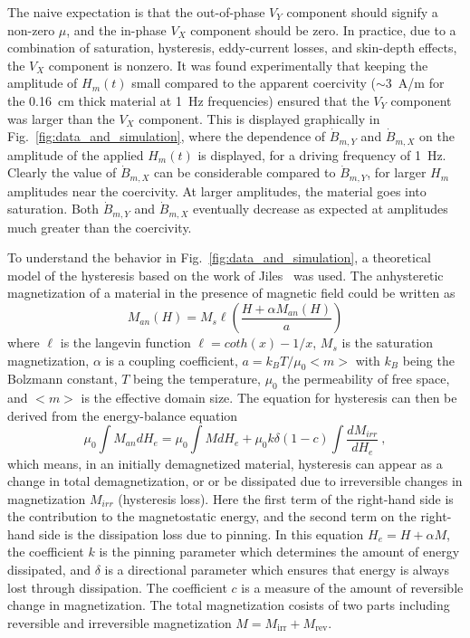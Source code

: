 The naive expectation is that the out-of-phase $V_Y$ component should
signify a non-zero $\mu$, and the in-phase $V_X$ component should be
zero.  In practice, due to a combination of saturation, hysteresis,
eddy-current losses, and skin-depth effects, the $V_X$ component is
nonzero.  It was found experimentally that keeping the amplitude of
$H_m(t)$ small compared to the apparent coercivity ($\sim 3$~A/m for
the 0.16~cm thick material at 1~Hz frequencies) ensured that the $V_Y$
component was larger than the $V_X$ component.  This is displayed
graphically in Fig.~\ref{fig:data_and_simulation}, where the
dependence of $\dot{B}_{m,Y}$ and $\dot{B}_{m,X}$ on the amplitude of
the applied $H_m(t)$ is displayed, for a driving frequency of 1~Hz.
Clearly the value of $\dot{B}_{m,X}$ can be considerable compared to
$\dot{B}_{m,Y}$, for larger $H_m$ amplitudes near the coercivity.  At
larger amplitudes, the material goes into saturation.  Both
$\dot{B}_{m,Y}$ and $\dot{B}_{m,X}$ eventually decrease as expected at
amplitudes much greater than the coercivity.

To understand the behavior in Fig.~\ref{fig:data_and_simulation}, a
theoretical model of the hysteresis based on the work of
Jiles~\cite{jiles1994frequency} was used.
The anhysteretic magnetization of a material in the presence of
magnetic field could be written as
\begin{equation}
M_{an}(H) =  M_s \ell \left( \frac{H + \alpha M_{an}(H)}{a} \right)
\end{equation}
where $\ell$ is the langevin function $\ell = coth(x) - 1/x$, $M_s$ is
the saturation magnetization, $\alpha$ is a coupling coefficient,
$a = k_BT/\mu_0 <m> $ with $k_B$ being the Bolzmann constant, $T$
being the temperature, $\mu_0$ the permeability of free space, and
$<m>$ is the effective domain size. The equation for hysteresis can then be derived from the energy-balance equation 
\begin{equation}
\mu_0 \int M_{an} dH_e  = \mu_0 \int M dH_e + \mu_0 k \delta(1-c) \int \frac{dM_{irr}}{dH_e}~,
\end{equation}
which means, in an initially demagnetized material, hysteresis can
appear as a change in total demagnetization, or or be dissipated due
to irreversible changes in magnetization $M_{irr}$ (hysteresis
loss). Here the first term of the right-hand side is the contribution
to the magnetostatic energy, and the second term on the right-hand
side is the dissipation loss due to pinning. In this equation
$H_e= H + \alpha M$, the coefficient $k$ is the pinning parameter
which determines the amount of energy dissipated, and $\delta$ is a
directional parameter which ensures that energy is always lost through
dissipation. The coefficient $c$ is a measure of the amount of
reversible change in magnetization.  The total magnetization cosists
of two parts including reversible and irreversible magnetization
$M = M_{\mathrm{irr}} + M_{\mathrm{rev}}$.

